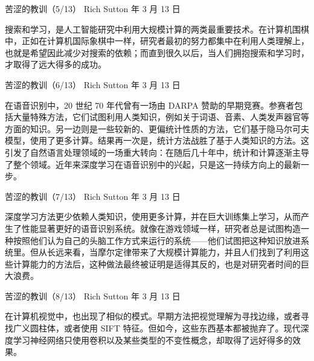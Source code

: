 \documentclass[UTF8,aspectratio=169,11pt,fontset=none]{ctexbeamer}
\begin{document}
\begin{frame}[t]{苦涩的教训（5/13）}
\relax
{\small\color{accent}Rich Sutton 年 3 月 13 日}\par
\vspace{0.22cm}
\begingroup
\fontsize{12}{20}\selectfont
搜索和学习，是人工智能研究中利用大规模计算的两类最重要技术。在计算机围棋中，正如在计算机国际象棋中一样，研究者最初的努力都集中在利用人类理解上，也就是希望因此减少对搜索的依赖；而直到很久以后，当人们拥抱搜索和学习时，才取得了远大得多的成功。
\par\endgroup
\end{frame}

\begin{frame}[t]{苦涩的教训（6/13）}
\relax
{\small\color{accent}Rich Sutton 年 3 月 13 日}\par
\vspace{0.22cm}
\begingroup
\fontsize{12}{20}\selectfont
在语音识别中，20 世纪 70 年代曾有一场由 DARPA 赞助的早期竞赛。参赛者包括大量特殊方法，它们试图利用人类知识，例如关于词语、音素、人类发声器官等方面的知识。另一边则是一些较新的、更偏统计性质的方法，它们基于隐马尔可夫模型，使用了更多计算。结果再一次是，统计方法战胜了基于人类知识的方法。这引发了自然语言处理领域的一场重大转向：在随后几十年中，统计和计算逐渐主导了整个领域。近年来深度学习在语音识别中的兴起，只是这一持续方向上的最新一步。
\par\endgroup
\end{frame}

\begin{frame}[t]{苦涩的教训（7/13）}
\relax
{\small\color{accent}Rich Sutton 年 3 月 13 日}\par
\vspace{0.22cm}
\begingroup
\fontsize{12}{20}\selectfont
深度学习方法更少依赖人类知识，使用更多计算，并在巨大训练集上学习，从而产生了性能显著更好的语音识别系统。就像在游戏领域一样，研究者总是试图构造一种按照他们认为自己的头脑工作方式来运行的系统——他们试图把这种知识放进系统里。但从长远来看，当摩尔定律带来了大规模计算能力，并且人们找到了利用这些计算能力的方法后，这种做法最终被证明是适得其反的，也是对研究者时间的巨大浪费。
\par\endgroup
\end{frame}

\begin{frame}[t]{苦涩的教训（8/13）}
\relax
{\small\color{accent}Rich Sutton 年 3 月 13 日}\par
\vspace{0.22cm}
\begingroup
\fontsize{12}{20}\selectfont
在计算机视觉中，也出现了相似的模式。早期方法把视觉理解为寻找边缘，或者寻找广义圆柱体，或者使用 SIFT 特征。但如今，这些东西基本都被抛弃了。现代深度学习神经网络只使用卷积以及某些类型的不变性概念，却取得了远好得多的效果。
\par\endgroup
\end{frame}
\end{document}
